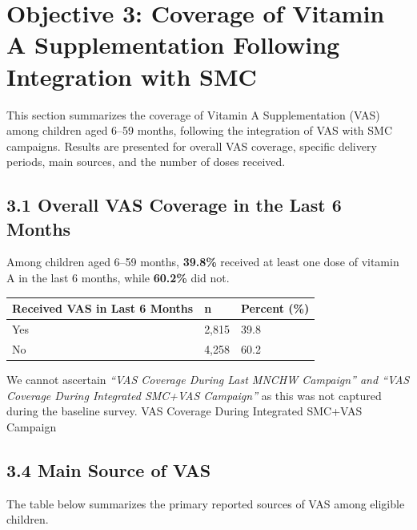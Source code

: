\documentclass[
  11pt,
]{report}
\begin{document}
\chapter{Objective 3: Coverage of Vitamin A Supplementation Following
Integration with
SMC}\label{objective-3-coverage-of-vitamin-a-supplementation-following-integration-with-smc}

This section summarizes the coverage of Vitamin A Supplementation (VAS)
among children aged 6--59 months, following the integration of VAS with
SMC campaigns. Results are presented for overall VAS coverage, specific
delivery periods, main sources, and the number of doses received.

\section{3.1 Overall VAS Coverage in the Last 6
Months}\label{overall-vas-coverage-in-the-last-6-months}

Among children aged 6--59 months, \textbf{39.8\%} received at least one
dose of vitamin A in the last 6 months, while \textbf{60.2\%} did not.

\begin{longtable}[]{@{}lll@{}}
\toprule\noalign{}
Received VAS in Last 6 Months & n & Percent (\%) \\
\midrule\noalign{}
\endhead
\bottomrule\noalign{}
\endlastfoot
Yes & 2,815 & 39.8 \\
No & 4,258 & 60.2 \\
\end{longtable}

We cannot ascertain \emph{``VAS Coverage During Last MNCHW Campaign''
and ``VAS Coverage During Integrated SMC+VAS Campaign''} as this was not
captured during the baseline survey. VAS Coverage During Integrated
SMC+VAS Campaign

\section{3.4 Main Source of VAS}\label{main-source-of-vas}

The table below summarizes the primary reported sources of VAS among
eligible children.
\end{document}
